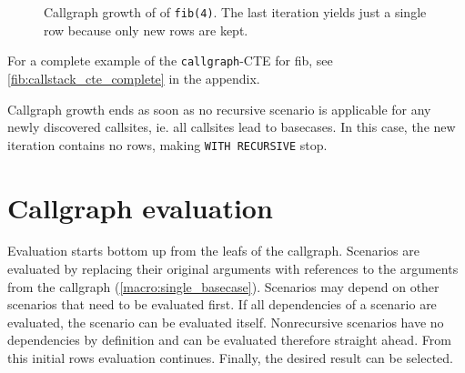 \begin{figure}[h]

    \caption{Callgraph growth of of \texttt{fib(4)}. The last iteration yields just a single row because only new rows are kept.}
    \label{callstack_recurse}
\end{figure}

For a complete example of the \texttt{callgraph}-CTE for fib, see \autoref{fib:callstack_cte_complete} in the appendix.

Callgraph growth ends as soon as no recursive scenario is applicable for any newly discovered callsites, ie. all callsites lead to basecases. In this case, the new iteration contains no rows, making \texttt{WITH RECURSIVE} stop.

\section{Callgraph evaluation}
Evaluation starts bottom up from the leafs of the callgraph. Scenarios are evaluated by replacing their original arguments with references to the arguments from the callgraph (\autoref{macro:single_basecase}). Scenarios may depend on other scenarios that need to be evaluated first. If all dependencies of a scenario are evaluated, the scenario can be evaluated itself. Nonrecursive scenarios have no dependencies by definition and can be evaluated therefore straight ahead. From this initial rows evaluation continues. Finally, the desired result can be selected.

